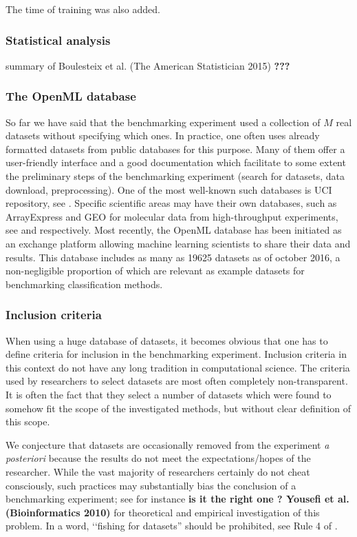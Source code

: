 \documentclass[12pt]{article}
\begin{document}
The time of training was also added.



\subsubsection{Statistical analysis}
\label{subsubsec:stat}
summary of Boulesteix et al. (The American Statistician 2015)
\textbf{???}

\subsubsection{The OpenML database}
\label{subsubsec:OpenML}

So far we have said that the benchmarking experiment used a collection of $M$ real datasets without specifying which ones. In practice, one often uses already formatted datasets from public databases for this purpose. Many of them offer a user-friendly interface and a good documentation which facilitate to some extent the preliminary steps of the benchmarking experiment (search for datasets, data download, preprocessing). One of the most well-known such databases is UCI repository, see \cite{Lichman:2013}. Specific scientific areas may have their own databases, such as ArrayExpress and GEO for molecular data from high-throughput experiments, see \cite{brazma2003arrayexpress} and  \cite{ncbiarchive} respectively. Most recently, the OpenML database \citep{vanschoren2014openml} has been initiated as an exchange platform allowing machine learning scientists to share their data and results. This database includes as many as 19625 datasets as of october 2016, a non-negligible proportion of which are relevant as example datasets for benchmarking classification methods.


\subsubsection{Inclusion criteria}
\label{subsubsec:incl}
When using a huge database of datasets, it becomes obvious that one has to define criteria for inclusion in the benchmarking experiment. Inclusion criteria in this context do not have any long tradition in computational science. The criteria used by researchers to select datasets are most often completely non-transparent. It is often the fact that they select a number of datasets which were found to somehow fit the scope of the investigated methods, but without clear definition of this scope. 

We conjecture that datasets are occasionally removed from the experiment {\it a posteriori} because the results do not meet the expectations/hopes of the researcher. While the vast majority of researchers certainly do not cheat consciously, such practices may substantially bias the conclusion of a benchmarking experiment; see for instance \cite{yousefi2010reporting} \textbf{is it the right one ? Yousefi et al. (Bioinformatics 2010)} for theoretical and empirical investigation of this problem. In a word, \lq\lq fishing for datasets'' should be prohibited, see Rule 4 of \cite{boulesteix2015ten}.
\end{document}
